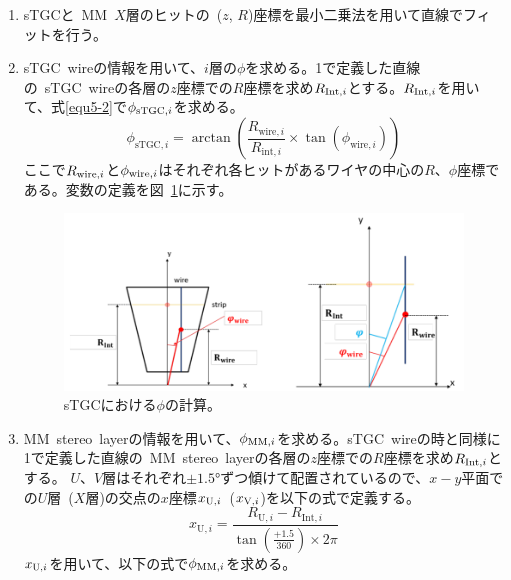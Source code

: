 \begin{enumerate}
    \item sTGCと~MM~$X$層のヒットの~($z$, $R$)座標を最小二乗法を用いて直線でフィットを行う。
    \item sTGC~wireの情報を用いて、$i$層の$\phi$を求める。1で定義した直線の~sTGC~wireの各層の$z$座標での$R$座標を求め$R_{{\rm{Int}},i}$とする。$R_{{\rm{Int}},i}$を用いて、式\eqref{equ5-2}で$\phi_{{\rm{sTGC}},i}$を求める。
    \begin{equation}
        \phi_{\mathrm{sTGC},i}=\arctan\left(\frac{R_{\mathrm{wire},i}}{R_{\mathrm{int},i}} \times \tan(\phi_{\mathrm{wire},i})\right)\label{equ5-2}
    \end{equation}
    ここで$R_{{\rm{wire}},i}$と$\phi_{{\rm{wire}},i}$はそれぞれ各ヒットがあるワイヤの中心の$R$、$\phi$座標である。変数の定義を図~\ref{fig:5-2}に示す。
    
    \begin{figure}[H]
        \centering
        \includegraphics[clip, width=12cm]{fig/5/sTGC_phi.png}
        \caption{sTGCにおける$\phi$の計算\cite{article:noguchi}。}
        \label{fig:5-2}
    \end{figure}
        
    \item MM~stereo~layerの情報を用いて、$\phi_{{\rm{MM}},i}$を求める。sTGC~wireの時と同様に1で定義した直線の~MM~stereo~layerの各層の$z$座標での$R$座標を求め$R_{{\rm{Int}},i}$とする。
    $U$、$V$層はそれぞれ$\pm\si{\ang{1.5}}$ずつ傾けて配置されているので、$x-y$平面での$U$層~($X$層)の交点の$x$座標$x_{{\rm{U}},i}$~($x_{{\rm{V}},i}$)を以下の式で定義する。
    \begin{equation}
        x_{\mathrm{U},i}=\frac{R_{\mathrm{U},i}-R_{\mathrm{Int},i}}{\tan(\frac{+1.5}{360}) \times 2\pi}\label{equ5-3}
    \end{equation}
    $x_{{\rm{U}},i}$を用いて、以下の式で$\phi_{{\rm{MM}},i}$を求める。
    

\end{enumerate}
